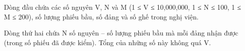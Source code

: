 Dòng đầu chứa các số nguyên V, N và M (1 ≤ V ≤ 10,000,000, 1 ≤ N ≤ 100, 1 ≤ M ≤ 200), số lượng phiếu bầu, số đảng và số ghế trong nghị viện.  

   Dòng thứ hai chứa N số nguyên – số lượng phiếu bầu mà mỗi đảng nhận được (trong số phiếu đã được kiểm). Tổng của những số này không quá V.